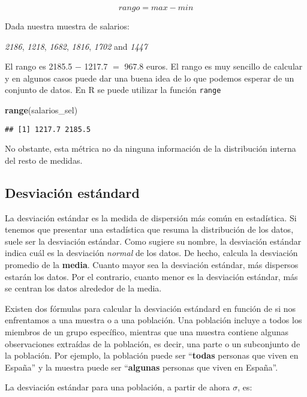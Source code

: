 \documentclass[
]{book}
\newenvironment{Shaded}{\begin{snugshade}}{\end{snugshade}}
\newcommand{\KeywordTok}[1]{\textcolor[rgb]{0.13,0.29,0.53}{\textbf{#1}}}
\newcommand{\NormalTok}[1]{#1}
\begin{document}
\[rango = max - min\]

Dada nuestra muestra de salarios:

\emph{2186}, \emph{1218}, \emph{1682}, \emph{1816}, \emph{1702} and \emph{1447}

El rango es 2185.5 \(-\) 1217.7 \(=\) 967.8 euros. El rango es muy sencillo de calcular y en algunos casos puede dar una buena idea de lo que podemos esperar de un conjunto de datos. En R se puede utilizar la función \texttt{range}

\begin{Shaded}
\begin{Highlighting}[]
\KeywordTok{range}\NormalTok{(salarios_sel)}
\end{Highlighting}
\end{Shaded}

\begin{verbatim}
## [1] 1217.7 2185.5
\end{verbatim}

No obstante, esta métrica no da ninguna información de la distribución interna del resto de medidas.

\hypertarget{desviaciuxf3n-estuxe1ndard}{%
\subsection{Desviación estándard}\label{desviaciuxf3n-estuxe1ndard}}

La desviación estándar es la medida de dispersión más común en estadística. Si tenemos que presentar una estadística que resuma la distribución de los datos, suele ser la desviación estándar. Como sugiere su nombre, la desviación estándar indica cuál es la desviación \emph{normal} de los datos. De hecho, calcula la desviación promedio de la \textbf{media}. Cuanto mayor sea la desviación estándar, más dispersos estarán los datos. Por el contrario, cuanto menor es la desviación estándar, más se centran los datos alrededor de la media.

Existen dos fórmulas para calcular la desviación estándard en función de si nos enfrentamos a una muestra o a una población. Una población incluye a todos los miembros de un grupo específico, mientras que una muestra contiene algunas observaciones extraídas de la población, es decir, una parte o un subconjunto de la población. Por ejemplo, la población puede ser ``\textbf{todas} personas que viven en España'' y la muestra puede ser ``\textbf{algunas} personas que viven en España''.

La desviación estándar para una población, a partir de ahora \(\sigma\), es:
\end{document}
